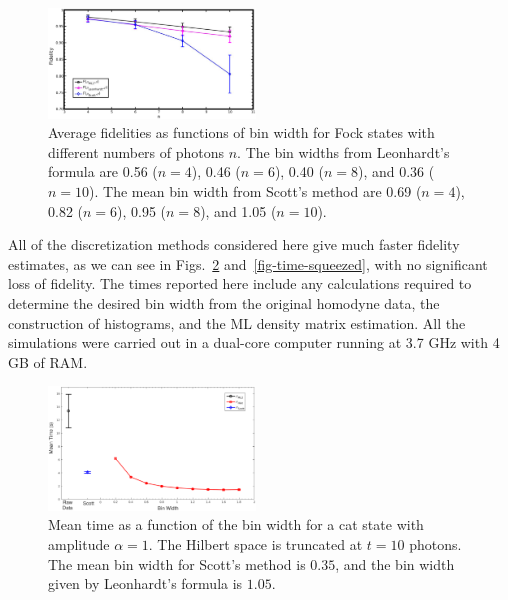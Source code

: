 \documentclass[
reprint,
superscriptaddress,
showpacs,
amsmath,
amssymb,
aps,
pra,
longbibliography
]{revtex4-1}
\begin{document}
\begin{figure}
  \includegraphics[width=0.49\textwidth]{fock.eps}
  \caption{Average fidelities as functions of bin width for Fock
    states with different numbers of photons $n$. The bin widths from
    Leonhardt's formula are 0.56 ($n=4$), 0.46 ($n=6$), 0.40 ($n=8$),
    and 0.36 ($n=10$). The mean bin width from Scott's method are 0.69
    ($n=4$), 0.82 ($n=6$), 0.95 ($n=8$), and 1.05 ($n=10$).}
  \label{fig-fock}
\end{figure}

All of the discretization methods considered here give much faster
fidelity estimates, as we can see in Figs.~\ref{fig-time-catstate}
and~\ref{fig-time-squeezed}, with no significant loss of fidelity. The
times reported here include any calculations required to determine the
desired bin width from the original homodyne data, the construction of
histograms, and the ML density matrix estimation. All the simulations
were carried out in a dual-core computer
running at 3.7 GHz with 4 GB of RAM.

\begin{figure}
  \includegraphics[width=0.49\textwidth]{time-estadogato_alpha_1.eps}
  \caption{Mean time as a function of the bin width for a cat state
    with amplitude $\alpha = 1$. The Hilbert space is truncated at $t=10$
    photons. The mean bin width for Scott's method is $0.35$, and the
    bin width given by Leonhardt's formula is $1.05$.}
  \label{fig-time-catstate}
\end{figure}
\end{document}
